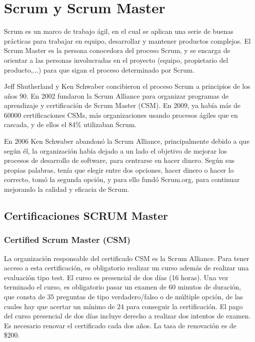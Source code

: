 \newpage{}
\section{Scrum y Scrum Master}

Scrum es un marco de trabajo ágil, en el cual se aplican una serie de buenas prácticas para trabajar en equipo, desarrollar y mantener productos complejos. El Scrum Master es la persona conocedora del proceso Scrum, y se encarga de orientar a las personas involucradas en el proyecto (equipo, propietario del producto,...) para que sigan el proceso determinado por Scrum.

Jeff Shutherland y Ken Schwaber concibieron el proceso Scrum a principios de los años 90. En 2002 fundaron la Scrum Alliance para organizar programas de aprendizaje y certificación de Scrum Master (CSM). En 2009, ya había más de 60000 certificaciones CSMs, más organizaciones usando procesos ágiles que en cascada, y de ellos el 84\% utilizaban Scrum.

En 2006 Ken Schwaber abandonó la Scrum Alliance, principalmente debido a que según él, la organización había dejado a un lado el objetivo de mejorar los procesos de desarrollo de software, para centrarse en hacer dinero. Según sus propias palabras, tenía que elegir entre dos opciones, hacer dinero o hacer lo correcto, tomó la segunda opción, y para ello fundó Scrum.org, para continuar mejorando la calidad y eficacia de Scrum.

\subsection{Certificaciones SCRUM Master}


\subsubsection{Certified Scrum Master (CSM)}

La organización responsable del certificado CSM es la Scrum Alliance. Para tener acceso a esta certificación, es obligatorio realizar un curso además de realizar una evaluación tipo test. El curso es presencial de dos días (16 horas). Una vez terminado el curso, es obligatorio pasar un examen de 60 minutos de duración, que consta de 35 preguntas de tipo verdadero/falso o de múltiple opción, de las cuales hay que acertar un mínimo de 24 para conseguir la certificación. El pago del curso presencial de dos días incluye derecho a realizar dos intentos de examen. Es necesario renovar el certificado cada dos años. La tasa de renovación es de \$200.


